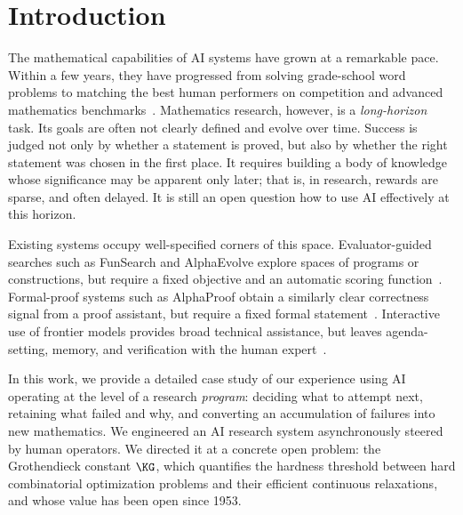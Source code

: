 \section{Introduction}
\label{sec:intro}

The mathematical capabilities of AI systems have grown at a remarkable pace.
Within a few years, they have progressed from solving grade-school word problems to matching the best human performers on competition and advanced mathematics benchmarks~\cite{hubert2026alphaproof, imo-gold, glazer2024frontiermath}.
Mathematics research, however, is a \emph{long-horizon} task.
Its goals are often not clearly defined and evolve over time. 
Success is judged not only by whether a statement is proved, but also by whether the right statement was chosen in the first place. 
It requires building a body of knowledge whose significance may be apparent only later; that is, in research, rewards are sparse, and often delayed.
It is still an open question how to use AI effectively at this horizon.

Existing systems occupy well-specified corners of this space.
Evaluator-guided searches such as FunSearch and AlphaEvolve explore spaces of programs or constructions, but require a fixed objective and an automatic scoring function~\cite{funsearch,novikov2025alphaevolvecodingagentscientific}.
Formal-proof systems such as AlphaProof obtain a similarly clear correctness signal from a proof assistant, but require a fixed formal statement~\cite{hubert2026alphaproof}.
Interactive use of frontier models provides broad technical assistance, but leaves agenda-setting, memory, and verification with the human expert~\cite{bubeck2025science}.

In this work, we provide a detailed case study of our experience using AI operating at the level of a research \emph{program}: deciding what to attempt next, retaining what failed and why, and converting an accumulation of failures into new mathematics.
We engineered an AI research system asynchronously steered by human operators.
We directed it at a concrete open problem: the Grothendieck constant $\KG$, which quantifies the hardness threshold between hard combinatorial optimization problems and their efficient continuous relaxations, and whose value has been open since 1953.

